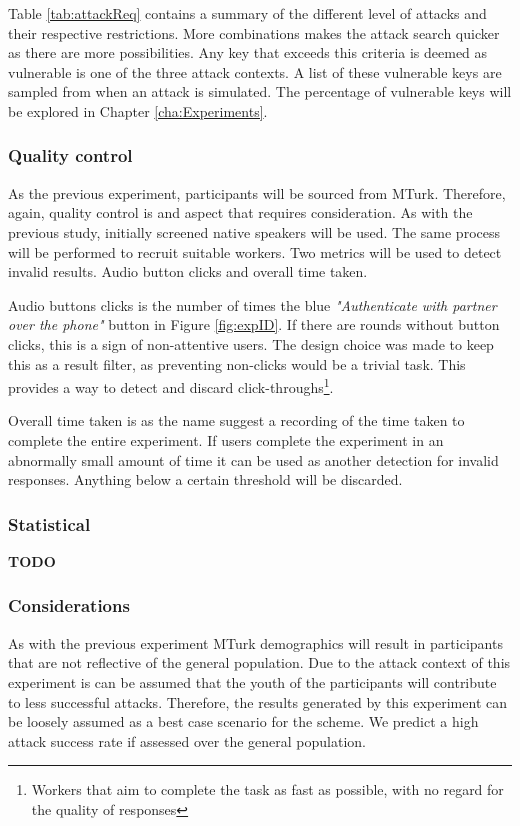 Table \ref{tab:attackReq} contains a summary of the different level of attacks and their respective restrictions. More combinations makes the attack search quicker as there are more possibilities. Any key that exceeds this criteria is deemed as vulnerable is one of the three attack contexts. A list of these vulnerable keys are sampled from when an attack is simulated. The percentage of vulnerable keys will be explored in Chapter \ref{cha:Experiments}.


\subsubsection{Quality control}
\label{sec:exp2_quality}
As the previous experiment, participants will be sourced from MTurk. Therefore, again, quality control is and aspect that requires consideration. As with the previous study, initially screened native speakers will be used. The same process will be performed to recruit suitable workers. Two metrics will be used to detect invalid results. Audio button clicks and overall time taken. 

Audio buttons clicks is the number of times the blue \textit{"Authenticate with partner over the phone"} button in Figure \ref{fig:expID}. If there are rounds without button clicks, this is a sign of non-attentive users. The design choice was made to keep this as a result filter, as preventing non-clicks would be a trivial task. This provides a way to detect and discard click-throughs\footnote{Workers that aim to complete the task as fast as possible, with no regard for the quality of responses}. 

Overall time taken is as the name suggest a recording of the time taken to complete the entire experiment. If users complete the experiment in an abnormally small amount of time it can be used as another detection for invalid responses. Anything below a certain threshold will be discarded.

\subsubsection{Statistical}
\textbf{TODO}

\subsubsection{Considerations}
As with the previous experiment MTurk demographics will result in participants that are not reflective of the general population. Due to the attack context of this experiment is can be assumed that the youth of the participants will contribute to less successful attacks. Therefore, the results generated by this experiment can be loosely assumed as a best case scenario for the scheme. We predict a high attack success rate if assessed over the general population.